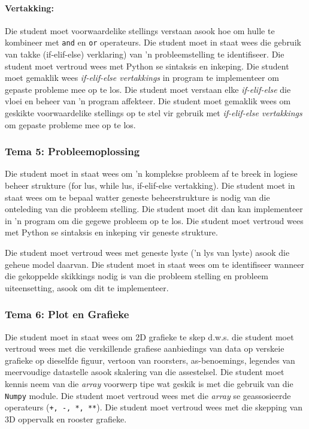             \paragraph{Vertakking:}
                Die student moet voorwaardelike stellings verstaan asook hoe om
                hulle te kombineer met \texttt {and} en \texttt{or} operateurs.
                Die student moet in staat wees die gebruik van takke
                (if-elif-else) verklaring) van 'n probleemstelling te
                identifiseer. Die student moet vertroud wees met Python se
                sintaksis en inkeping. Die student moet gemaklik wees
                \textit{if-elif-else vertakkings} in program te implementeer om
                gepaste probleme mee op te los.  Die student moet verstaan elke
                \textit{if-elif-else} die vloei en beheer van 'n program
                affekteer.  Die student moet gemaklik wees om geskikte
                voorwaardelike stellings op te stel vir gebruik met
                \textit{if-elif-else vertakkings} om gepaste probleme mee op te
                los.

        \subsubsection{Tema 5: Probleemoplossing}
            Die student moet in staat wees om 'n komplekse probleem af te breek
            in logiese beheer strukture (for lus, while lus, if-elif-else
            vertakking). Die student moet in staat wees om te bepaal watter
            geneste beheerstrukture is nodig van die onteleding van die
            probleem stelling. Die student moet dit dan kan implementeer in 'n
            program om die gegewe probleem op te los. Die student moet vertroud
            wees met Python se sintaksis en inkeping vir geneste strukture.

            Die student moet vertroud wees met geneste lyste ('n lys van lyste)
            asook die geheue model daarvan.  Die student moet in staat wees om
            te identifiseer wanneer die gekoppelde skikkings nodig is van die
            probleem stelling en probleem uiteensetting, asook om dit te
            implementeer.

        \subsubsection{Tema 6: Plot en Grafieke}
            Die student moet in staat wees om 2D grafieke te skep d.w.s. die
            student moet vertroud wees met die verskillende grafiese
            aanbiedings van data op verskeie grafieke op dieselfde figuur,
            vertoon van roorsters, as-benoemings, legendes van meervoudige
            datastelle asook skalering van die assestelsel. Die student moet
            kennis neem van die \textit{array} voorwerp tipe wat geskik is met
            die gebruik van die \texttt{Numpy} module. Die student moet
            vertroud wees met die \textit{array} se geassosieerde operateurs
            (\texttt {+, -, *, **}). Die student moet vertroud wees met die
            skepping van 3D oppervalk en rooster grafieke.

